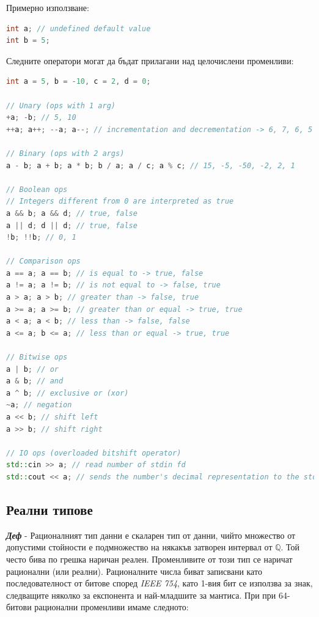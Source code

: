 \documentclass[fleqn,12pt]{article}
\begin{document}
Примерно използване:
\begin{lstlisting}[language=C++, caption=Integer variables]
int a; // undefined default value
int b = 5;
\end{lstlisting}

Следните оператори могат да бъдат прилагани над целочислени променливи:

\begin{lstlisting}[language=C++, caption=Integer operators]
int a = 5, b = -10, c = 2, d = 0;

// Unary (ops with 1 arg)
+a; -b; // 5, 10
++a; a++; --a; a--; // incrementation and decrementation -> 6, 7, 6, 5

// Binary (ops with 2 args)
a - b; a + b; a * b; b / a; a / c; a % c; // 15, -5, -50, -2, 2, 1

// Boolean ops
// Integers different from 0 are interpreted as true
a && b; a && d; // true, false
a || d; d || d; // true, false
!b; !!b; // 0, 1

// Comparison ops
a == a; a == b; // is equal to -> true, false
a != a; a != b; // is not equal to -> false, true
a > a; a > b; // greater than -> false, true
a >= a; a >= b; // greater than or equal -> true, true
a < a; a < b; // less than -> false, false
a <= a; b <= a; // less than or equal -> true, true

// Bitwise ops
a | b; // or
a & b; // and
a ^ b; // exclusive or (xor)
~a; // negation
a << b; // shift left
a >> b; // shift right

// IO ops (overloaded bitshift operator)
std::cin >> a; // read number of stdin fd
std::cout << a; // sends the number's decimal representation to the stdout fd
\end{lstlisting}

\subsection{Реални типове}

\noindent \textit{\textbf{Деф}} - Рационалният тип данни е скаларен тип от данни, чийто множество от допустими стойности е подмножество на някакъв затворен интервал от $\mathbb{Q}$.
Той често бива по грешка наричан реален. Променливите от този тип се наричат рационални (или реални).
Рационалните числа биват записвани като последователност от битове според \textit{IEEE 754}, като 1-вия бит се използва за знак, следващите няколко за експонента и най-младшите за мантиса.
При при 64-битови рационални променливи имаме следното:
\end{document}
